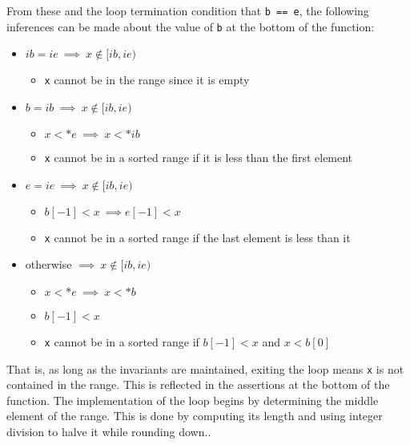 From these and the loop termination condition that \texttt{b == e}, the
following inferences can be made about the value of \texttt{b} at the bottom of
the function:

\begin{itemize}
    \item
        $ib = ie \ \implies \ x \notin [ib, ie)$
        \begin{itemize}
            \item \texttt{x} cannot be in the range since it is empty
        \end{itemize}
    \item
        $b = ib \ \implies \ x \notin [ib, ie)$
        \begin{itemize}
            \item $x < *e \ \implies \ x < *ib$
            \item
                \texttt{x} cannot be in a sorted range if it is less than the
                first element
        \end{itemize}
    \item
        $e = ie \ \implies \ x \notin [ib, ie)$
        \begin{itemize}
            \item $b[-1] < x \ \implies e[-1] < x$
            \item
                \texttt{x} cannot be in a sorted range if the last element is
                less than it
        \end{itemize}
    \item
        otherwise $\implies \ x \notin [ib, ie)$
        \begin{itemize}
            \item $x < *e \ \implies \ x < *b$
            \item $b[-1] < x$
            \item
                \texttt{x} cannot be in a sorted range if $b[-1] < x$ and $x <
                b[0]$
        \end{itemize}
\end{itemize}

That is, as long as the invariants are maintained, exiting the loop means
\texttt{x} is not contained in the range.  This is reflected in the assertions
at the bottom of the function.  The implementation of the loop begins by
determining the middle element of the range.  This is done by computing its
length and using integer division to halve it while rounding down.\footnotemark.

